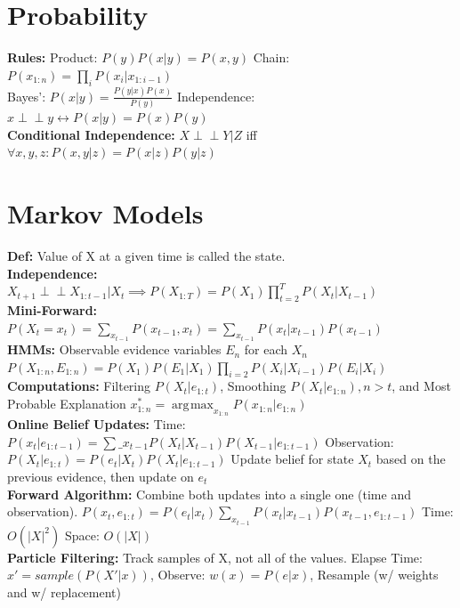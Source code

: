 \documentclass[10pt, a4paper]{article}
\DeclareMathOperator*{\argmax}{\arg\!\max}
\begin{document}
\begin{multicols*}{1}
        \section*{Probability}
            \textbf{Rules:} Product: $P(y)P(x|y) = P(x, y)$ Chain: $P(x_{1:n}) = \prod\limits_i P(x_i | x_{1:i - 1})$\\ Bayes': $P(x|y) = \frac{P(y|x)P(x)}{P(y)}$ Independence: $x \!\perp\!\!\!\perp\! y \leftrightarrow P(x|y) = P(x) P(y)$\\
            \textbf{Conditional Independence:} $X \!\perp\!\!\!\perp\! Y | Z$ iff $\forall x, y, z: P(x,y|z) = P(x|z)P(y|z)$
        \section*{Markov Models}
            \textbf{Def:} Value of X at a given time is called the state.\\
            \textbf{Independence:} $X_{t + 1} \!\perp\!\!\!\perp\! X_{1:t-1} | X_{t} \implies P(X_{1:T}) = P(X_1) \prod\limits_{t=2}^T P(X_t | X_{t-1})$\\
            \textbf{Mini-Forward:} $P(X_t = x_t) = \sum\limits_{x_{t - 1}} P(x_{t - 1}, x_t) = \sum\limits_{x_{t - 1}} P(x_t | x_{t - 1}) P(x_{t - 1})$\\
            \textbf{HMMs:} Observable evidence variables $E_n$ for each $X_n$\\ $P(X_{1:n}, E_{1:n}) = P(X_1)P(E_1|X_1)\prod\limits_{i=2}P(X_i|X_{i-1})P(E_i|X_i)$\\
            \textbf{Computations:} Filtering $P(X_t | e_{1:t})$, Smoothing $P(X_t | e_{1:n}), n>t$, and Most Probable Explanation $x^*_{1:n} = \argmax_{x_{1:n}} P(x_{1:n} | e_{1:n})$\\
            \textbf{Online Belief Updates:} Time: $P(x_t|e_{1:t-1})=\sum\_{x_{t-1}}P(X_t|X_{t-1})P(X_{t-1}|e_{1:t-1})$ Observation: $P(X_t|e_{1:t})=P(e_t|X_t)P(X_t|e_{1:t-1})$ Update belief for state $X_t$ based on the previous evidence, then update on $e_t$\\
            \textbf{Forward Algorithm:} Combine both updates into a single one (time and observation). $P(x_t, e_{1:t}) = P(e_t|x_t) \sum\limits_{x_{t-1}} P(x_t | x_{t - 1}) P(x_{t-1}, e_{1:t-1})$ Time: $O(|X|^2)$ Space: $O(|X|)$\\
            \textbf{Particle Filtering:} Track samples of X, not all of the values. Elapse Time: $x' = sample(P(X' | x))$, Observe: $w(x) = P(e | x)$, Resample (w/ weights and w/ replacement)

\end{multicols*}
\end{document}

